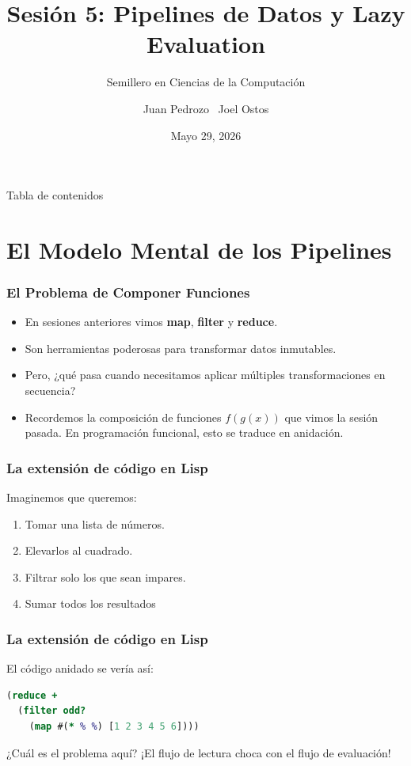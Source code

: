 \documentclass{beamer}
\title{Sesión 5: Pipelines de Datos y Lazy Evaluation}
\subtitle{Semillero en Ciencias de la Computación}
\author[Pedrozo, Ostos]{Juan Pedrozo \ Joel Ostos}
\date{Mayo 29, 2026}
\begin{document}
\frame{\titlepage}

\begin{frame}{Tabla de contenidos}
    \tableofcontents    
\end{frame}

\section{El Modelo Mental de los Pipelines}

\begin{frame}
    \frametitle{El Problema de Componer Funciones}
    \begin{itemize}
        \item En sesiones anteriores vimos \textbf{map}, \textbf{filter} y \textbf{reduce}.
        \item Son herramientas poderosas para transformar datos inmutables.
        \item Pero, ¿qué pasa cuando necesitamos aplicar múltiples transformaciones en secuencia?
        \item Recordemos la composición de funciones $f(g(x))$ 
        que vimos la sesión pasada. En programación funcional, esto se traduce en anidación.
    \end{itemize}
\end{frame}

\begin{frame}[fragile]
    \frametitle{La extensión de código en Lisp}
    Imaginemos que queremos:
    \begin{enumerate}
        \item Tomar una lista de números.
        \item Elevarlos al cuadrado.
        \item Filtrar solo los que sean impares.
        \item Sumar todos los resultados
        \end{enumerate}
    \end{frame}

\begin{frame}[fragile]
    \frametitle{La extensión de código en Lisp}
    El código anidado se vería así:
    \vspace{0.5cm}
    \begin{lstlisting}[language=Clojure]
(reduce + 
  (filter odd? 
    (map #(* % %) [1 2 3 4 5 6])))
    \end{lstlisting}
    \vspace{0.5cm}
    ¿Cuál es el problema aquí? ¡El flujo de lectura choca con el flujo de evaluación!
\end{frame}
\end{document}
